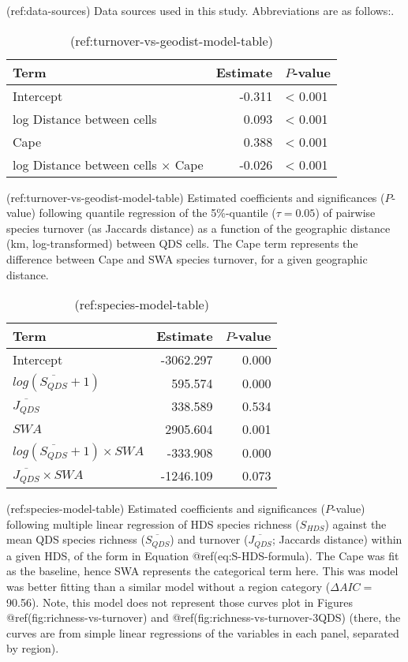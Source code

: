 (ref:data-sources) Data sources used in this study. Abbreviations are as
follows:.

\begin{table}[!h]
\caption{\label{tab:turnover-vs-geodist-model-table}(ref:turnover-vs-geodist-model-table)}

\centering
\begin{tabular}[t]{lrl}
\toprule
Term & Estimate & $P$-value\\
\midrule
Intercept & -0.311 & < 0.001\\
log Distance between cells & 0.093 & < 0.001\\
Cape & 0.388 & < 0.001\\
log Distance between cells $\times$ Cape & -0.026 & < 0.001\\
\bottomrule
\end{tabular}
\end{table}

(ref:turnover-vs-geodist-model-table) Estimated coefficients and
significances (\(P\)-value) following quantile regression of the
5\%-quantile (\(\tau = 0.05\)) of pairwise species turnover (as Jaccards
distance) as a function of the geographic distance (km, log-transformed)
between QDS cells. The Cape term represents the difference between Cape
and SWA species turnover, for a given geographic distance.

\begin{table}[!h]
\caption{\label{tab:species-model-table}(ref:species-model-table)}

\centering
\begin{tabular}[t]{lrr}
\toprule
Term & Estimate & $P$-value\\
\midrule
Intercept & -3062.297 & 0.000\\
$log(\overline{S_{QDS}} + 1)$ & 595.574 & 0.000\\
$\overline{J_{QDS}}$ & 338.589 & 0.534\\
$SWA$ & 2905.604 & 0.001\\
$log(\overline{S_{QDS}} + 1) \times SWA$ & -333.908 & 0.000\\
$\overline{J_{QDS}} \times SWA$ & -1246.109 & 0.073\\
\bottomrule
\end{tabular}
\end{table}

(ref:species-model-table) Estimated coefficients and significances
(\(P\)-value) following multiple linear regression of HDS species
richness (\(S_{HDS}\)) against the mean QDS species richness
(\(\overline{S_{QDS}}\)) and turnover (\(\overline{J_{QDS}}\); Jaccards
distance) within a given HDS, of the form in Equation
@ref(eq:S-HDS-formula). The Cape was fit as the baseline, hence SWA
represents the categorical term here. This was model was better fitting
than a similar model without a region category (\(\Delta AIC =\) 90.56).
Note, this model does not represent those curves plot in Figures
@ref(fig:richness-vs-turnover) and @ref(fig:richness-vs-turnover-3QDS)
(there, the curves are from simple linear regressions of the variables
in each panel, separated by region).

